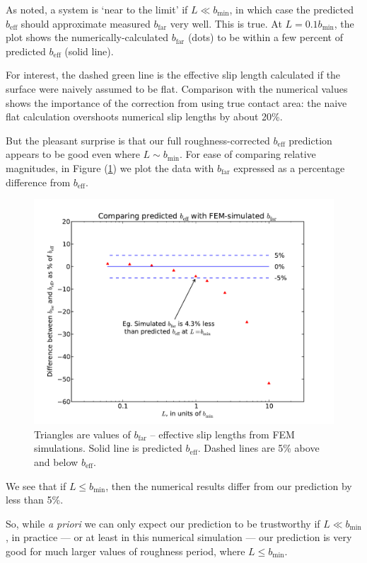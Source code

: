 \documentclass[12pt, a4paper, twoside, openright]{book}
\newcommand{\beff}{\ensuremath{b_{\mathrm{eff}}}}
\newcommand{\bmin}{\ensuremath{b_{\mathrm{min}}}}
\newcommand{\bfar}{\ensuremath{b_{\mathrm{far}}}}
\begin{document}
As noted, a system is `near to the limit' if $L \ll \bmin$, in which case the predicted $\beff$ should approximate measured $\bfar$ very well.  This is true.  At $L = 0.1 \bmin$, the plot shows the numerically-calculated $\bfar$ (dots) to be within a few percent of predicted $\beff$ (solid line).

For interest,
the dashed green line is the effective slip length calculated if the surface were naively assumed to be flat.  Comparison with the numerical values shows the importance of the correction from using true contact area: the naive flat calculation overshoots numerical slip lengths by about 20\%.



But the pleasant surprise is that our full roughness-corrected $\beff$ prediction appears to be good even where $L \sim \bmin$.
For ease of comparing relative magnitudes, in Figure (\ref{FEMplotpcnt}) we plot the data with $\bfar$ expressed as a percentage difference from $\beff$.


\begin{figure}[ht]
\includegraphics[scale=0.595]{Lund_Thesis_FEM_plot_pcnt}
\caption{Triangles are values of $\bfar$ -- effective slip lengths from FEM simulations.  Solid line is predicted $\beff$.  Dashed lines are 5\% above and below $\beff$.}\label{FEMplotpcnt}
\end{figure}

We see that if $L \leq \bmin$, then the numerical results differ from our prediction by less than 5\%.

So, while \emph{a priori} we can only expect our prediction to be trustworthy if $L \ll \bmin$, in practice --- or at least in this numerical simulation --- our prediction is very good for much larger values of roughness period, where $L \leq \bmin$.
\end{document}

